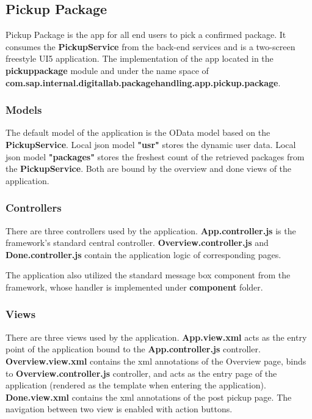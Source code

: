 \subsection{Pickup Package}

Pickup Package is the app for all end users to pick a confirmed package. It consumes the \textbf{PickupService} from the back-end services and is a two-screen freestyle UI5 application. The implementation of the app located in the \textbf{pickuppackage} module and under the name space of \textbf{com.sap.internal.digitallab.packagehandling.app.pickup.package}.

\subsubsection{Models}
The default model of the application is the OData model based on the \textbf{PickupService}. Local json model \textbf{"usr"} stores the dynamic user data. Local json model \textbf{"packages"} stores the freshest count of the retrieved packages from the \textbf{PickupService}. Both are bound by the overview and done views of the application.

\subsubsection{Controllers}
There are three controllers used by the application. \textbf{App.controller.js} is the framework's standard central controller. \textbf{Overview.controller.js} and \textbf{Done.controller.js} contain the application logic of corresponding pages.

The application also utilized the standard message box component from the framework, whose handler is implemented under \textbf{component} folder.

\subsubsection{Views}
There are three views used by the application. \textbf{App.view.xml} acts as the entry point of the application bound to the \textbf{App.controller.js} controller. \textbf{Overview.view.xml} contains the xml annotations of the Overview page, binds to \textbf{Overview.controller.js} controller, and acts as the entry page of the application (rendered as the template when entering the application). \textbf{Done.view.xml} contains the xml annotations of the post pickup page. The navigation between two view is enabled with action buttons.

